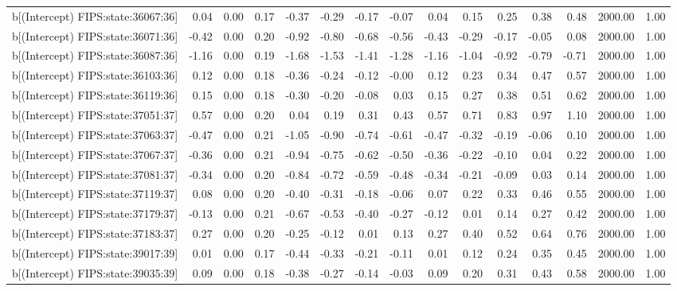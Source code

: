 \begin{table}[ht]
\begin{tabular}{rrrrrrrrrrrrrrr}
  b[(Intercept) FIPS:state:36067:36] & 0.04 & 0.00 & 0.17 & -0.37 & -0.29 & -0.17 & -0.07 & 0.04 & 0.15 & 0.25 & 0.38 & 0.48 & 2000.00 & 1.00 \\ 
  b[(Intercept) FIPS:state:36071:36] & -0.42 & 0.00 & 0.20 & -0.92 & -0.80 & -0.68 & -0.56 & -0.43 & -0.29 & -0.17 & -0.05 & 0.08 & 2000.00 & 1.00 \\ 
  b[(Intercept) FIPS:state:36087:36] & -1.16 & 0.00 & 0.19 & -1.68 & -1.53 & -1.41 & -1.28 & -1.16 & -1.04 & -0.92 & -0.79 & -0.71 & 2000.00 & 1.00 \\ 
  b[(Intercept) FIPS:state:36103:36] & 0.12 & 0.00 & 0.18 & -0.36 & -0.24 & -0.12 & -0.00 & 0.12 & 0.23 & 0.34 & 0.47 & 0.57 & 2000.00 & 1.00 \\ 
  b[(Intercept) FIPS:state:36119:36] & 0.15 & 0.00 & 0.18 & -0.30 & -0.20 & -0.08 & 0.03 & 0.15 & 0.27 & 0.38 & 0.51 & 0.62 & 2000.00 & 1.00 \\ 
  b[(Intercept) FIPS:state:37051:37] & 0.57 & 0.00 & 0.20 & 0.04 & 0.19 & 0.31 & 0.43 & 0.57 & 0.71 & 0.83 & 0.97 & 1.10 & 2000.00 & 1.00 \\ 
  b[(Intercept) FIPS:state:37063:37] & -0.47 & 0.00 & 0.21 & -1.05 & -0.90 & -0.74 & -0.61 & -0.47 & -0.32 & -0.19 & -0.06 & 0.10 & 2000.00 & 1.00 \\ 
  b[(Intercept) FIPS:state:37067:37] & -0.36 & 0.00 & 0.21 & -0.94 & -0.75 & -0.62 & -0.50 & -0.36 & -0.22 & -0.10 & 0.04 & 0.22 & 2000.00 & 1.00 \\ 
  b[(Intercept) FIPS:state:37081:37] & -0.34 & 0.00 & 0.20 & -0.84 & -0.72 & -0.59 & -0.48 & -0.34 & -0.21 & -0.09 & 0.03 & 0.14 & 2000.00 & 1.00 \\ 
  b[(Intercept) FIPS:state:37119:37] & 0.08 & 0.00 & 0.20 & -0.40 & -0.31 & -0.18 & -0.06 & 0.07 & 0.22 & 0.33 & 0.46 & 0.55 & 2000.00 & 1.00 \\ 
  b[(Intercept) FIPS:state:37179:37] & -0.13 & 0.00 & 0.21 & -0.67 & -0.53 & -0.40 & -0.27 & -0.12 & 0.01 & 0.14 & 0.27 & 0.42 & 2000.00 & 1.00 \\ 
  b[(Intercept) FIPS:state:37183:37] & 0.27 & 0.00 & 0.20 & -0.25 & -0.12 & 0.01 & 0.13 & 0.27 & 0.40 & 0.52 & 0.64 & 0.76 & 2000.00 & 1.00 \\ 
  b[(Intercept) FIPS:state:39017:39] & 0.01 & 0.00 & 0.17 & -0.44 & -0.33 & -0.21 & -0.11 & 0.01 & 0.12 & 0.24 & 0.35 & 0.45 & 2000.00 & 1.00 \\ 
  b[(Intercept) FIPS:state:39035:39] & 0.09 & 0.00 & 0.18 & -0.38 & -0.27 & -0.14 & -0.03 & 0.09 & 0.20 & 0.31 & 0.43 & 0.58 & 2000.00 & 1.00 \\ 

\end{tabular}
\end{table}
